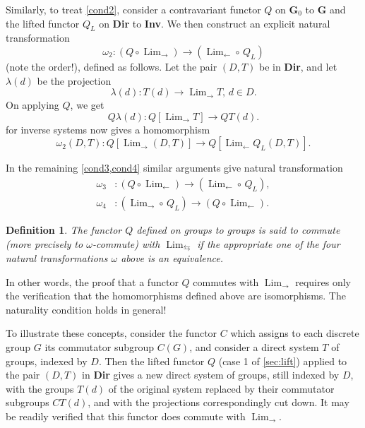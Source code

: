 \documentclass[11pt,a4paper]{report}
\newtheorem*{thdef}{Definition}
\DeclareMathOperator{\Lim}{Lim}
\begin{document}
Similarly, to treat \cref{cond2}, consider a contravariant functor $Q$ on $\mathbf{G}_0$ to $\mathbf{G}$ and the lifted functor
$Q_L$ on \textbf{Dir} to \textbf{Inv}. We then construct an explicit natural transformation
\begin{equation}\label{eq:nat_case2}
	\omega_2:(Q\circ\Lim_{\rightarrow})\rightarrow(\Lim_{\leftarrow}\circ\, Q_L)
\end{equation}
(note the order!), defined as follows. Let the pair $(D,T)$ be in \textbf{Dir}, and let $\lambda(d)$ be the projection
\begin{equation*}
	\lambda(d):T(d)\rightarrow \Lim_{\rightarrow}T,\,d\in D.
\end{equation*}
On applying $Q$, we get
\begin{equation*}
	Q\lambda(d):Q[\Lim_{\rightarrow}T]\rightarrow QT(d).
\end{equation*}
 for inverse systems now gives a homomorphism
\begin{equation*}
	\omega_2(D,T):Q[\Lim_{\rightarrow}(D,T)]\rightarrow Q[\Lim_{\leftarrow}Q_L(D,T)].
\end{equation*}

In the remaining \cref{cond3,cond4} similar arguments give natural transformation
\begin{align}
	\omega_3 &:(Q\circ\Lim_{\leftarrow})\rightarrow(\Lim_{\leftarrow}\circ\, Q_L),\label{eq:nat_case3}\\
	\omega_4 &:(\Lim_{\rightarrow}\circ\, Q_L)\rightarrow (Q\circ\Lim_{\leftarrow}).\label{eq:nat_case4}
\end{align}
\begin{thdef}
	The functor $Q$ defined on groups to groups is said to commute (more precisely to $\omega$-commute) 
	with $\Lim_{\leftrightarrows}$ if the appropriate one of the four natural transformations $\omega$
	above is an equivalence.
\end{thdef}

In other words, the proof that a functor $Q$ commutes with $\Lim_{\rightarrow}$ requires only the verification that the 
homomorphisms defined above are isomorphisms. The naturality condition holds in general!

To illustrate these concepts, consider the functor $C$ which assigns to each discrete group $G$ its commutator
subgroup $C(G)$, and consider a direct system $T$ of groups, indexed by $D$. Then the lifted functor $Q$
(case 1 of \cref{sec:lift}) applied to the pair $(D,T)$ in \textbf{Dir} gives a new direct system of groups,
still indexed by $D$, with the groups $T(d)$ of the original system replaced by their commutator
subgroups $CT(d)$, and with the projections correspondingly cut down. It may be readily verified that
this functor does commute with $\Lim_{\rightarrow}$.
\end{document}
